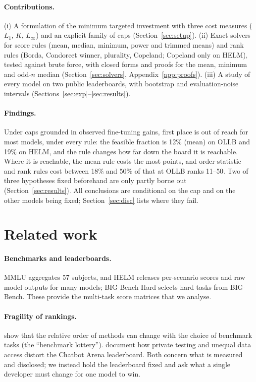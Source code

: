 \documentclass{article}
\begin{document}
\paragraph{Contributions.}
(i) A formulation of the minimum targeted investment with three cost measures ($L_1$, $K$, $L_\infty$) and an explicit family of caps (Section~\ref{sec:setup}). (ii) Exact solvers for score rules (mean, median, minimum, power and trimmed means) and rank rules (Borda, Condorcet winner, plurality, Copeland; Copeland only on HELM), tested against brute force, with closed forms and proofs for the mean, minimum and odd-$n$ median (Section~\ref{sec:solvers}, Appendix~\ref{app:proofs}). (iii) A study of every model on two public leaderboards, with bootstrap and evaluation-noise intervals (Sections~\ref{sec:exp}--\ref{sec:results}).

\paragraph{Findings.}
Under caps grounded in observed fine-tuning gains, first place is out of reach for most models, under every rule: the feasible fraction is 12\% (mean) on OLLB and 19\% on HELM, and the rule changes how far down the board it is reachable. Where it is reachable, the mean rule costs the most points, and order-statistic and rank rules cost between 18\% and 50\% of that at OLLB ranks 11--50. Two of three hypotheses fixed beforehand are only partly borne out (Section~\ref{sec:results}). All conclusions are conditional on the cap and on the other models being fixed; Section~\ref{sec:disc} lists where they fail.

\section{Related work}
\label{sec:related}
\paragraph{Benchmarks and leaderboards.}
MMLU \citep{hendrycks2021mmlu} aggregates 57 subjects, and HELM \citep{liang2023helm} releases per-scenario scores and raw model outputs for many models; BIG-Bench Hard \citep{suzgun2023bbh} selects hard tasks from BIG-Bench. These provide the multi-task score matrices that we analyse.

\paragraph{Fragility of rankings.}
\citet{dehghani2021lottery} show that the relative order of methods can change with the choice of benchmark tasks (the ``benchmark lottery''). \citet{singh2025illusion} document how private testing and unequal data access distort the Chatbot Arena leaderboard. Both concern what is measured and disclosed; we instead hold the leaderboard fixed and ask what a single developer must change for one model to win.
\end{document}
